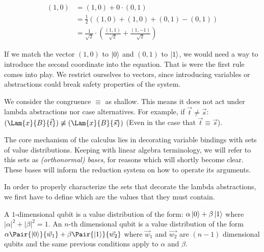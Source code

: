 \begin{align*}
  (1,0) &= (1,0) + 0 \cdot (0,1) \\
  &=\frac{1}{2} ((1,0) + (1,0) + (0,1) - (0,1))\\
  &=\frac{1}{\sqrt{2}}\cdot\left(\frac{(1,1)}{\sqrt{2}} + \frac{(1,-1)}{\sqrt{2}}\right)  
\end{align*}

If we match the vector $(1,0)$ to $\ket{0}$ and $(0,1)$ to $\ket{1}$, we would need a way to introduce the second coordinate into the equation. That is were the first rule comes into play. We restrict ourselves to vectors, since introducing variables or abstractions could break safety properties of the system.

We consider the congruence $\equiv$ as shallow. This means it does not act under lambda abstractions nor case alternatives. For example, if $\vec{t}\neq\vec{s}$: $(\Lam{x}{B}{\vec{t}}) \not\equiv (\Lam{x}{B}{\vec{s}})$ (Even in the case that $\vec{t}\equiv\vec{s}$).



The core mechanism of the calculus lies in decorating variable bindings with sets of value distributions. Keeping with linear algebra terminology, we will refer to this sets as \textit{(orthonormal) bases}, for reasons which will shortly become clear. These bases will inform the reduction system on how to operate its arguments. 

In order to properly characterize the sets that decorate the lambda abstractions, we first have to define which are the values that they must contain.
\begin{definition}
  A $1$-dimensional qubit is a value distribution of the form: $\alpha \ket{0} + \beta \ket{1}$ where $|\alpha|^2 + |\beta|^2 = 1$. An $n$-th dimensional qubit is a value distribution of the form $\alpha\Pair{\ket{0}}{\vec w_1} + \beta\Pair{\ket{1}}{\vec{w_2}} $ where $\vec w_1$ and $\vec{w_2}$ are $(n-1)$ dimensional qubits and the same previous conditions apply to $\alpha$ and $\beta$.
\end{definition}

